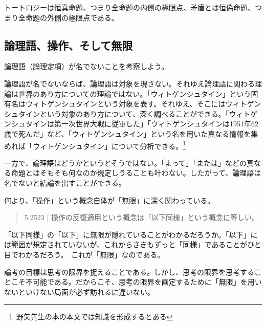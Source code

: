 \documentclass[a4paper,onecolumn,article]{jarticle}
\newcounter{ct}               %
\begin{document}
トートロジーは恒真命題、つまり全命題の内側の極限点、矛盾とは恒偽命題、つまり全命題の外側の極限点である。

\subsection{論理語、操作、そして無限}

論理語（論理定項）が名でないことを考察しよう。

論理語が名でないならば、論理語は対象を現さない。それゆえ論理語に関わる理論は世界のあり方についての理論ではない。「ウィトゲンシュタイン」という固有名はウィトゲンシュタインという対象を表す。それゆえ、そこにはウィトゲンシュタインという対象のあり方について、深く調べることができる。「ウィトゲンシュタインは第一次世界大戦に従軍した」「ウィトゲンシュタインは1951年62歳で死んだ」など、「ウィトゲンシュタイン」という名を用いた真なる情報を集めれば「ウィトゲンシュタイン」について分析できる。\footnote{野矢先生の本の本文では知識を形成するとある}

一方で、論理語はどうかというとそうではない。「よって」「または」などの真なる命題とはそもそも何なのか規定しうることも叶わない。したがって、論理語は名でないと結論を出すことができる。

何より、「操作」という概念自体が「無限」に深く関わっている。

\begin{quote}
  5.2523 | 操作の反復適用という概念は「以下同様」という概念に等しい。
\end{quote}

「以下同様」の「以下」に無限が隠れていることがわかるだろうか。「以下」には範囲が規定されていないが、これからさきもずっと「同様」であることがひと目でわかるだろう。 これが「無限」なのである。

論考の目標は思考の限界を捉えることである。しかし、思考の限界を思考することこそ不可能である。だからこそ、思考の限界を画定するために「無限」を用いないといけない局面が必ず訪れるに違いない。
\end{document}

